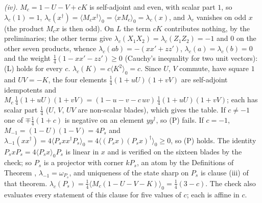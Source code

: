 \emph{(iv).} $M_{c} = 1 - U - V + cK$ is self-adjoint and even, with scalar part $1$, so $\lambda_{c}(1) = 1$, $\lambda_{c}(x^{\dagger}) = \langle M_{c}x^{\dagger}\rangle_{0} = \langle xM_{c}\rangle_{0} = \lambda_{c}(x)$, and $\lambda_{c}$ vanishes on odd $x$ (the product $M_{c}x$ is then odd). On $L$ the term $cK$ contributes nothing, by the preliminaries; the other terms give $\lambda_{c}(X_{1}X_{2}) = \lambda_{c}(Z_{1}Z_{2}) = -1$ and $0$ on the other seven products, whence $\lambda_{c}(ab) = -(xx' + zz')$, $\lambda_{c}(a) = \lambda_{c}(b) = 0$ and the weight $\tfrac14(1 - xx' - zz') \ge 0$ (Cauchy's inequality for two unit vectors): (L) holds for every $c$. $\lambda_{c}(K) = c\langle K^{2}\rangle_{0} = c$. Since $U$, $V$ commute, have square $1$ and $UV = -K$, the four elements $\tfrac14(1 + uU)(1 + vV)$ are self-adjoint idempotents and $M_{c}\,\tfrac14(1 + uU)(1 + vV) = (1 - u - v - c\,uv)\,\tfrac14(1 + uU)(1 + vV)$; each has scalar part $\tfrac14$ ($U$, $V$, $UV$ are non-scalar blades), which gives the table. If $c \ne -1$ one of $\mp\tfrac14(1 + c)$ is negative on an element $yy^{\dagger}$, so (P) fails. If $c = -1$, $M_{-1} = (1 - U)(1 - V) = 4P_{s}$ and $\lambda_{-1}(xx^{\dagger}) = 4\langle P_{s}xx^{\dagger}P_{s}\rangle_{0} = 4\langle(P_{s}x)(P_{s}x)^{\dagger}\rangle_{0} \ge 0$, so (P) holds. The identity $P_{s}xP_{s} = 4\langle P_{s}x\rangle_{0}P_{s}$ is linear in $x$ and is verified on the sixteen blades by the check; so $P_{s}$ is a projector with corner $kP_{s}$, an atom by the Definitions of Theorem , $\lambda_{-1} = \omega_{P_{s}}$, and uniqueness of the state sharp on $P_{s}$ is clause (iii) of that theorem. $\lambda_{c}(P_{s}) = \tfrac14\langle M_{c}(1 - U - V - K)\rangle_{0} = \tfrac14(3 - c)$. The check also evaluates every statement of this clause for five values of $c$; each is affine in $c$.

